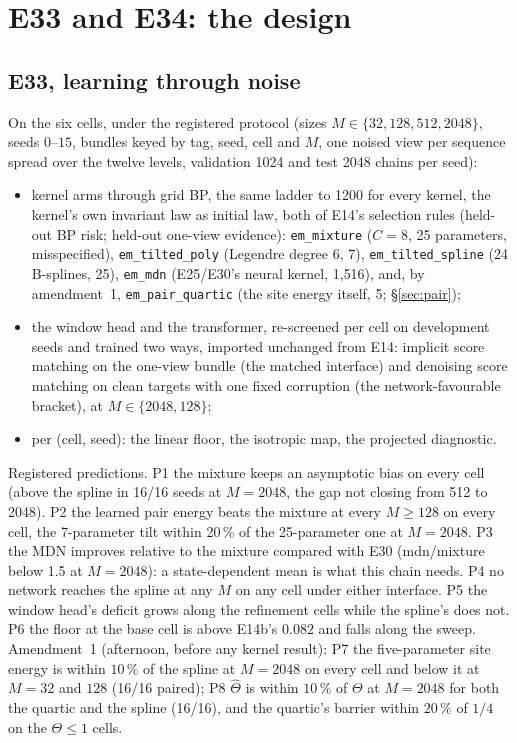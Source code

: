 \documentclass[10pt,a4paper]{article}
\newcommand{\Th}{\Theta}
\newcommand{\code}[1]{\texttt{\small #1}}
\theoremstyle{plain}
\theoremstyle{remark}
\begin{document}
\section{E33 and E34: the design}\label{sec:e33}

\subsection{E33, learning through noise}

On the six cells, under the registered protocol (sizes $M\in\{32,128,512,2048\}$, seeds $0$--$15$,
bundles keyed by tag, seed, cell and $M$, one noised view per sequence spread over the twelve
levels, validation 1024 and test 2048 chains per seed):

\begin{itemize}[leftmargin=1.4em,itemsep=0.1em]
\item kernel arms through grid BP, the same ladder to 1200 for every kernel, the kernel's own
  invariant law as initial law, both of E14's selection rules (held-out BP risk; held-out one-view
  evidence): \code{em\_mixture} ($C=8$, 25 parameters, misspecified), \code{em\_tilted\_poly} (Legendre
  degree 6, 7), \code{em\_tilted\_spline} (24 B-splines, 25), \code{em\_mdn} (E25/E30's neural kernel,
  1{,}516), and, by amendment~1, \code{em\_pair\_quartic} (the site energy itself, 5; \S\ref{sec:pair});
\item the window head and the transformer, re-screened per cell on development seeds and trained
  two ways, imported unchanged from E14: implicit score matching on the one-view bundle (the matched
  interface) and denoising score matching on clean targets with one fixed corruption (the
  network-favourable bracket), at $M\in\{2048,128\}$;
\item per (cell, seed): the linear floor, the isotropic map, the projected diagnostic.
\end{itemize}

Registered predictions. P1 the mixture keeps an asymptotic bias on every cell (above the spline in
16/16 seeds at $M=2048$, the gap not closing from 512 to 2048). P2 the learned pair energy beats the
mixture at every $M\ge128$ on every cell, the 7-parameter tilt within 20\,\% of the 25-parameter one
at $M=2048$. P3 the MDN improves relative to the mixture compared with E30 (mdn/mixture below 1.5
at $M=2048$): a state-dependent mean is what this chain needs. P4 no network reaches the spline at
any $M$ on any cell under either interface. P5 the window head's deficit grows along the refinement
cells while the spline's does not. P6 the floor at the base cell is above E14b's $0.082$ and falls
along the sweep. Amendment~1 (afternoon, before any kernel result): P7 the five-parameter site energy
is within $10\,\%$ of the spline at $M=2048$ on every cell and below it at $M=32$ and $128$ (16/16
paired); P8 $\hat\Th$ is within $10\,\%$ of $\Th$ at $M=2048$ for both the quartic and the spline
(16/16), and the quartic's barrier within $20\,\%$ of $1/4$ on the $\Th\le1$ cells.
\end{document}
